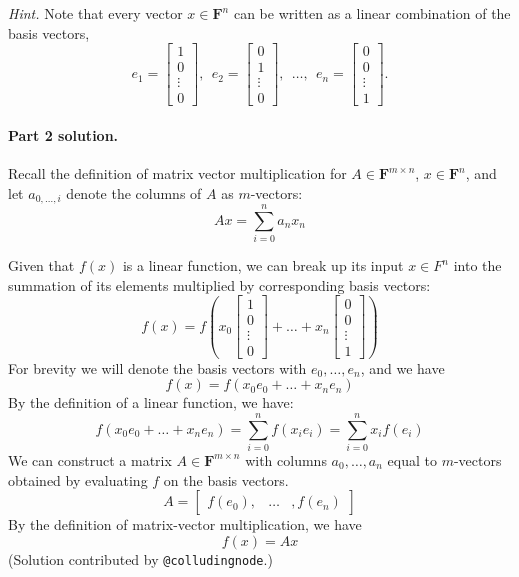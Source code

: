 \documentclass[12pt,hidelinks]{article}
\newcommand{\field}{\mathbf{F}}
\begin{document}
\emph{Hint.} Note that every vector $x \in \field^n$ can be written
as a linear combination of the basis vectors,
\[
    e_1 = \begin{bmatrix}
        1\\0\\\vdots\\0
    \end{bmatrix},
    ~~
    e_2 = 
    \begin{bmatrix}
        0\\1\\\vdots\\0
    \end{bmatrix},
    ~~
    \dots,
    ~~
    e_n = 
    \begin{bmatrix}
        0\\0\\\vdots\\1
    \end{bmatrix}.
\]

\begin{solution}
\paragraph{Part 2 solution.} 
Recall the definition of matrix vector multiplication for $A \in \field^{m \times n }$, $x \in \field^n$, and let $a_{0, \dots , i}$ denote the columns of $A$ as $m$-vectors:
\[
Ax = \sum_{i=0}^{n} a_{n}x_{n}
\]

Given that $f(x)$ is a linear function, we can break up its input $x \in F^n$ into the summation of its elements multiplied by corresponding basis vectors:
\[
f(x) = f(x_{0}\begin{bmatrix}
        1\\0\\\vdots\\0
    \end{bmatrix} + \dots + x_{n}\begin{bmatrix}
        0\\0\\\vdots\\1
    \end{bmatrix})
\]
For brevity we will denote the basis vectors with $e_{0}, \dots , e_{n}$, and we have
\[
f(x) = f(x_{0}e_{0} + \dots + x_{n}e_{n})
\]
By the definition of a linear function, we have:
\[
f(x_{0}e_{0} + \dots + x_{n}e_{n}) = \sum_{i=0}^{n}f(x_{i}e_{i}) = \sum_{i=0}^{n}x_{i}f(e_{i})
\]
We can construct a matrix $A \in \field^{m \times n}$ with columns $a_{0}, \dots , a_{n}$ equal to $m$-vectors obtained by evaluating $f$ on the basis vectors.
\[
A = \begin{bmatrix} f(e_{0}) , & \dots &, f(e_{n}) \end{bmatrix}
\]
By the definition of matrix-vector multiplication, we have
\[
f(x) = Ax
\]
(Solution
contributed by \verb|@colludingnode|.)
\end{solution}
\end{document}
